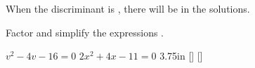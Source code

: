 
\begin{tcolorbox}[center,width=5in]
    \setlength{\parskip}{1em}
    When the discriminant is ,
    there will be   in the solutions.

    Factor and simplify the expressions 
    .
\end{tcolorbox}

\myProblems
{
    $  v^2 - 4v - 16 = 0  $
}
{
    $  2x^2 + 4x - 11 = 0  $
}
{3.75in}
[]
[]
